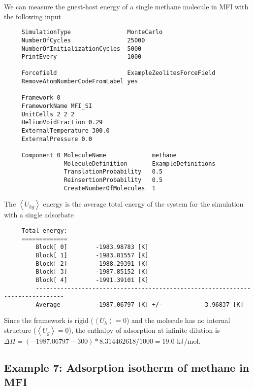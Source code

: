 \noindent
We can measure the guest-host energy of a single methane molecule in MFI with the following input
\begin{tiny}
\begin{verbatim}
     SimulationType                MonteCarlo
     NumberOfCycles                25000
     NumberOfInitializationCycles  5000
     PrintEvery                    1000

     Forcefield                    ExampleZeolitesForceField
     RemoveAtomNumberCodeFromLabel yes

     Framework 0
     FrameworkName MFI_SI
     UnitCells 2 2 2
     HeliumVoidFraction 0.29
     ExternalTemperature 300.0
     ExternalPressure 0.0

     Component 0 MoleculeName             methane
                 MoleculeDefinition       ExampleDefinitions
                 TranslationProbability   0.5
                 ReinsertionProbability   0.5
                 CreateNumberOfMolecules  1
\end{verbatim}
\end{tiny}

\noindent
The $\left\langle U_{hg}\right\rangle$ energy is the average total energy of the system for the simulation with a single adsorbate
\begin{tiny}
\begin{verbatim}
     Total energy:
     =============
         Block[ 0]        -1983.98783 [K]
         Block[ 1]        -1983.81557 [K]
         Block[ 2]        -1988.29391 [K]
         Block[ 3]        -1987.85152 [K]
         Block[ 4]        -1991.39101 [K]
         ------------------------------------------------------------------------------
         Average          -1987.06797 [K] +/-            3.96837 [K]
\end{verbatim}
\end{tiny}
Since the framework is rigid ($\left\langle U_{h}\right\rangle=0$) and the molecule has no internal structure
($\left\langle U_{g}\right\rangle=0$), the enthalpy of adsorption at infinite dilution is
$\Delta H = (-1987.06797-300)*8.314462618/1000=19.0$ kJ/mol.


\subsection*{Example 7: Adsorption isotherm of methane in MFI}

